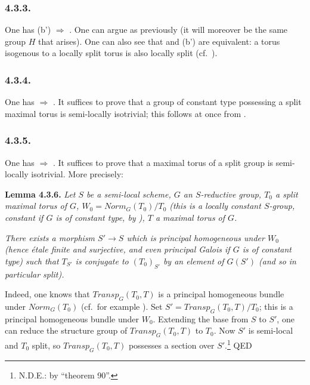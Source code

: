 \subsubsection*{4.3.3.}

One has (b') \(\Rightarrow\) . One can argue as previously (it will moreover be the same group \(H\) that arises). One can also see
that  and (b') are equivalent: a torus isogenous to a locally split torus is also locally split (cf.~).

\subsubsection*{4.3.4.}

One has  \(\Rightarrow\) . It suffices to prove that a group of constant type possessing a split maximal torus is semi-locally
isotrivial; this follows at once from .

\subsubsection*{4.3.5.}

One has  \(\Rightarrow\) . It suffices to prove that a maximal torus of a split group is semi-locally isotrivial. More
precisely:

\textbf{Lemma 4.3.6.} \emph{Let \(S\) be a semi-local scheme, \(G\) an \(S\)-reductive group, \(T_0\) a split maximal torus of \(G\), \(W_{0}
= Norm_{G}(T_{0}) / T_{0}\) (this is a locally constant \(S\)-group, constant if \(G\) is of constant type, by ), \(T\) a
maximal torus of \(G\).}

\emph{There exists a morphism \(S' \to S\) which is principal homogeneous under \(W_0\) (hence étale finite and surjective, and
even principal Galois if \(G\) is of constant type) such that \(T_{S'}\) is conjugate to \((T_{0})_{S'}\) by an element of
\(G(S')\) (and so in particular split).}

Indeed, one knows that \(Transp_{G}(T_{0}, T)\) is a principal homogeneous bundle under \(Norm_{G}(T_{0})\) (cf.~for example
). Set \(S' = Transp_{G}(T_{0}, T) / T_{0}\); this is a principal homogeneous bundle under \(W_0\).
Extending the base from \(S\) to \(S'\), one can reduce the structure group of \(Transp_{G}(T_{0}, T)\) to \(T_0\). Now \(S'\) is
semi-local and \(T_0\) split, so \(Transp_{G}(T_{0}, T)\) possesses a section over \(S'\).\footnote{N.D.E.: by ``theorem 90''.} QED

